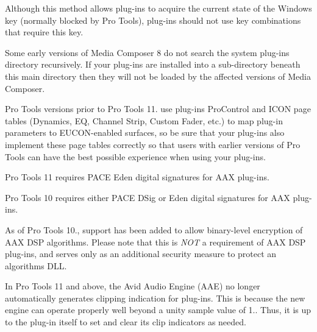 \begin{DoxyRefList}
\item[\label{a00381__compatibility_notes000061}%
\hypertarget{a00381__compatibility_notes000061}{}%
Member \hyperlink{a00117_ac2fe16f6d81a8d941e36242d9f9d0980}{A\+A\+X\+\_\+\+I\+View\+Container\+:\+:Get\+Modifiers} (uint32\+\_\+t $\ast$out\+Modifiers)=0]Although this method allows plug-\/ins to acquire the current state of the Windows key (normally blocked by Pro Tools), plug-\/ins should not use key combinations that require this key. 
\item[\label{a00381__compatibility_notes000006}%
\hypertarget{a00381__compatibility_notes000006}{}%
Module \hyperlink{a00361}{A\+A\+X\+\_\+\+Media\+\_\+\+Composer\+\_\+\+Guide} ]Some early versions of Media Composer 8 do not search the system plug-\/ins directory recursively. If your plug-\/ins are installed into a sub-\/directory beneath this main directory then they will not be loaded by the affected versions of Media Composer. 
\item[\label{a00381__compatibility_notes000019}%
\hypertarget{a00381__compatibility_notes000019}{}%
Module \hyperlink{a00363}{A\+A\+X\+\_\+\+Page\+\_\+\+Table\+\_\+\+Guide} ]Pro Tools versions prior to Pro Tools 11. use plug-\/ins\textquotesingle{} Pro\+Control and I\+C\+O\+N page tables (Dynamics, E\+Q, Channel Strip, Custom Fader, etc.) to map plug-\/in parameters to E\+U\+C\+O\+N-\/enabled surfaces, so be sure that your plug-\/ins also implement these page tables correctly so that users with earlier versions of Pro Tools can have the best possible experience when using your plug-\/ins. 
\item[\label{a00381__compatibility_notes000010}%
\hypertarget{a00381__compatibility_notes000010}{}%
Module \hyperlink{a00360}{A\+A\+X\+\_\+\+Pro\+\_\+\+Tools\+\_\+\+Guide} ]Pro Tools 11 requires P\+A\+C\+E Eden digital signatures for A\+A\+X plug-\/ins.

Pro Tools 10 requires either P\+A\+C\+E D\+Sig or Eden digital signatures for A\+A\+X plug-\/ins.

As of Pro Tools 10., support has been added to allow binary-\/level encryption of A\+A\+X D\+S\+P algorithms. Please note that this is {\itshape N\+O\+T} a requirement of A\+A\+X D\+S\+P plug-\/ins, and serves only as an additional security measure to protect an algorithm\textquotesingle{}s D\+L\+L. 

In Pro Tools 11 and above, the Avid Audio Engine (A\+A\+E) no longer automatically generates clipping indication for plug-\/ins. This is because the new engine can operate properly well beyond a unity sample value of 1.. Thus, it is up to the plug-\/in itself to set and clear its clip indicators as needed.


\end{DoxyRefList}
